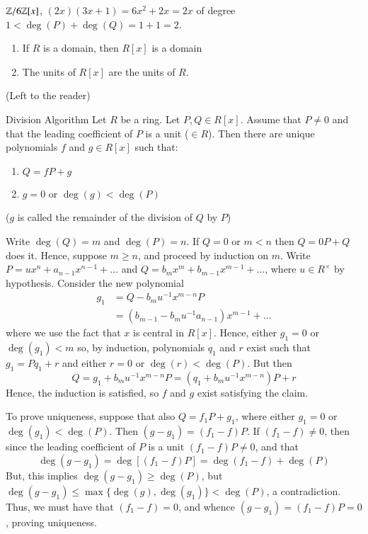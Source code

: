 \documentclass[12pt, a4paper, twoside, openright, titlepage]{book}
\begin{document}
\begin{eg}{}{}
    $\mathbb Z/6\mathbb Z[x]$, $(2x)(3x+1) = 6x^2+2x = 2x$ of degree $1 < \deg(P) + \deg(Q) = 1 + 1 = 2$.
\end{eg}

\begin{cor}{}{}
    \leavevmode
    \begin{enumerate}
        \item If $R$ is a domain, then $R[x]$ is a domain
        \item The units of $R[x]$ are the units of $R$.
    \end{enumerate}
    \begin{proof*}{}{}
        (Left to the reader)
    \end{proof*}
\end{cor}

\begin{thm}{Division Algorithm}{}
    Let $R$ be a ring. Let $P,Q \in R[x]$. Assume that $P \neq 0$ and that the leading coefficient of $P$ is a unit ($\in R$). Then there are unique polynomials $f$ and $g \in R[x]$ such that: \begin{enumerate}
        \item $Q = fP + g$
        \item $g = 0$ or $\deg(g) < \deg(P)$
    \end{enumerate}
    ($g$ is called the remainder of the division of $Q$ by $P$)
\end{thm}
\begin{proof*}{}{}
    Write $\deg(Q) = m$ and $\deg(P) = n$. If $Q = 0$ or $m < n$ then $Q = 0P + Q$ does it. Hence, suppose $m \geq n$, and proceed by induction on $m$. Write $P = ux^n + a_{n-1}x^{n-1} + ...$ and $Q = b_mx^m + b_{m-1}x^{m-1} + ...$, where $u \in R^{\times}$ by hypothesis. Consider the new polynomial \begin{align*}
        g_1 &= Q - b_mu^{-1}x^{m-n}P \\
        &= (b_{m-1} - b_mu^{-1}a_{n-1})x^{m-1} + ...
    \end{align*}
    where we use the fact that $x$ is central in $R[x]$. Hence, either $g_1 = 0$ or $\deg(g_1) < m$ so, by induction, polynomials $q_1$ and $r$ exist such that $g_1 = Pq_1 + r$ and either $r = 0$ or $\deg(r) < \deg(P)$. But then $$Q = g_1 + b_mu^{-1}x^{m-n}P = (q_1 + b_mu^{-1}x^{m-n})P + r$$
    Hence, the induction is satisfied, so $f$ and $g$ exist satisfying the claim. 
    
    To prove uniqueness, suppose that also $Q = f_1P + g_1$, where either $g_1 = 0$ or $\deg(g_1) < \deg(P)$. Then $(g-g_1) = (f_1-f)P$. If $(f_1-f) \neq 0$, then since the leading coefficient of $P$ is a unit $(f_1-f)P \neq 0$, and that $$\deg(g-g_1) = \deg[(f_1-f)P] = \deg(f_1-f)+\deg(P)$$ But, this implies $\deg(g-g_1) \geq \deg(P)$, but $\deg(g-g_1) \leq \max\{\deg(g),\deg(g_1)\} < \deg(P)$, a contradiction. Thus, we must have that $(f_1-f) = 0$, and whence $(g-g_1) = (f_1 - f)P = 0$, proving uniqueness.
\end{proof*}
\end{document}
